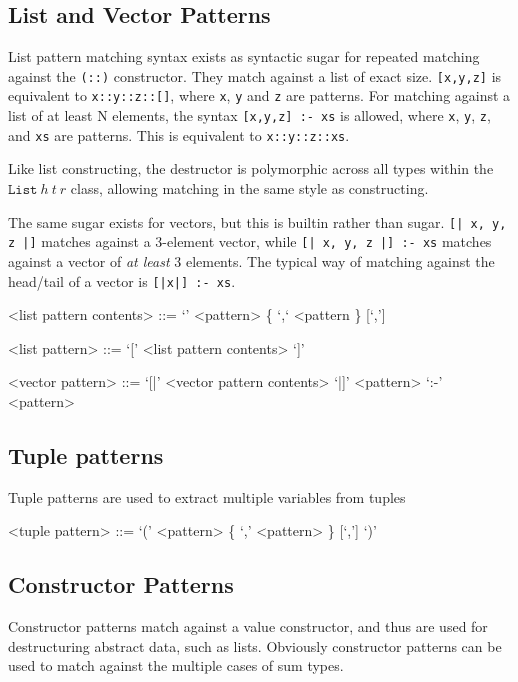 \subsection{List and Vector Patterns}
List pattern matching syntax exists as syntactic sugar for repeated matching against the \texttt{(::)} constructor. They match against a list of exact size. \texttt{[x,y,z]} is equivalent to \texttt{x::y::z::[]}, where \texttt{x}, \texttt{y} and \texttt{z} are patterns. For matching against a list of at least N elements, the syntax \texttt{[x,y,z] :- xs} is allowed, where \texttt{x}, \texttt{y}, \texttt{z}, and \texttt{xs} are patterns. This is equivalent to \texttt{x::y::z::xs}.

Like list constructing, the destructor is polymorphic across all types within the $\mathtt{List}\ h\ t\ r$ class, allowing matching in the same style as constructing.

The same sugar exists for vectors, but this is builtin rather than sugar. \texttt{[| x, y, z |]} matches against a 3-element vector, while \texttt{[| x, y, z |] :- xs} matches against a vector of \textit{at least} 3 elements. The typical way of matching against the head/tail of a vector is \texttt{[|x|] :- xs}.

\begin{grammar}
<list pattern contents> ::= `'
                       \alt <pattern> \{ `,` <pattern \} [`,']

<list pattern>          ::= `[' <list pattern contents> `]'

<vector pattern>        ::= `[|' <vector pattern contents> `|]'
                       \alt <pattern> `:-' <pattern>
\end{grammar}

\subsection{Tuple patterns}
Tuple patterns are used to extract multiple variables from tuples

\begin{grammar}
<tuple pattern> ::= `(' <pattern> \{ `,' <pattern> \} [`,'] `)'
\end{grammar}

\subsection{Constructor Patterns}
Constructor patterns match against a value constructor, and thus are used for destructuring abstract data, such as lists. Obviously constructor patterns can be used to match against the multiple cases of sum types.

